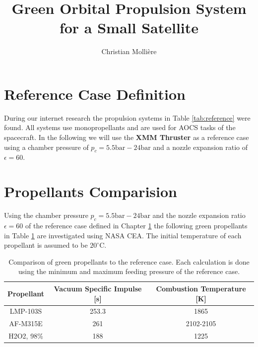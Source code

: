 \documentclass[12pt]{article}
\begin{document}
 
 
\title{Green Orbital Propulsion System for a Small Satellite}
\author{Christian Molli\`ere}
\maketitle

\section{Reference Case Definition}
\label{chap:reference_case}
During our internet research the propulsion systems in Table \ref{tab:reference} were found. All systems use monopropellants and are used for AOCS tasks of the spacecraft. In the following we will use the \textbf{XMM Thruster} as a reference case using a chamber pressure of $p_c=5.5\text{bar}-24\text{bar}$ and a nozzle expansion ratio of $\epsilon=60$.\\
 
\section{Propellants Comparision}
Using the chamber pressure $p_c=5.5\text{bar}-24\text{bar}$ and the nozzle expansion ratio $\epsilon=60$ of the reference case defined in Chapter \ref{chap:reference_case} the following green propellants in Table \ref{tab:comparison} are investigated using NASA CEA. The initial temperature of each propellant is assumed to be $20^\circ\text{C}$.

\begin{table}[h!]
	\centering
	\caption{Comparison of green propellants to the reference case. Each calculation is done using the minimum and maximum feeding pressure of the reference case.}
	\begin{tabular}{|c|c|c|}
		\hline
		Propellant & Vacuum Specific Impulse {[}s{]} & Combustion Temperature {[}K{]} \\ \hline
		LMP-103S   & 253.3                         & 1865                      \\ \hline
		AF-M315E   & 261                         & 2102-2105                      \\ \hline
		H2O2, 98\% & 188                         & 1225                      \\ \hline     
	\end{tabular}
	\label{tab:comparison}
\end{table}
\end{document}
